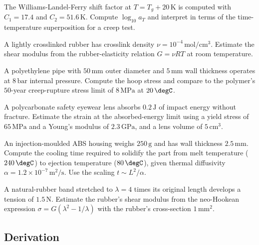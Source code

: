 \begin{exercise}
The Williams-Landel-Ferry shift factor at $T = T_g + 20\,\si{\kelvin}$
is computed with $C_1 = 17.4$ and $C_2 = 51.6\,\si{\kelvin}$. Compute
$\log_{10} a_T$ and interpret in terms of the time-temperature
superposition for a creep test.
\end{exercise}

\begin{exercise}
A lightly crosslinked rubber has crosslink density $\nu = 10^{-4}\,
\text{mol}/\text{cm}^3$. Estimate the shear modulus from the
rubber-elasticity relation $G = \nu R T$ at room temperature.
\end{exercise}

\begin{exercise}
A polyethylene pipe with $50\,\text{mm}$ outer diameter and $5\,\text{mm}$
wall thickness operates at $8\,\text{bar}$ internal pressure. Compute
the hoop stress and compare to the polymer's $50$-year creep-rupture
stress limit of $8\,\text{MPa}$ at $20\,\degC$.
\end{exercise}

\begin{exercise}
A polycarbonate safety eyewear lens absorbs $0.2\,\text{J}$ of impact
energy without fracture. Estimate the strain at the absorbed-energy
limit using a yield stress of $65\,\text{MPa}$ and a Young's modulus
of $2.3\,\text{GPa}$, and a lens volume of $5\,\text{cm}^3$.
\end{exercise}

\begin{exercise}
An injection-moulded ABS housing weighs $250\,\text{g}$ and has wall
thickness $2.5\,\text{mm}$. Compute the cooling time required to
solidify the part from melt temperature ($240\,\degC$) to ejection
temperature ($80\,\degC$), given thermal diffusivity $\alpha = 1.2
\times 10^{-7}\,\text{m}^2/\si{\second}$. Use the scaling $t \sim
L^2/\alpha$.
\end{exercise}

\begin{exercise}
A natural-rubber band stretched to $\lambda = 4$ times its original
length develops a tension of $1.5\,\text{N}$. Estimate the rubber's
shear modulus from the neo-Hookean expression $\sigma = G(\lambda^2
- 1/\lambda)$ with the rubber's cross-section $1\,\text{mm}^2$.
\end{exercise}

\subsection*{Derivation}

